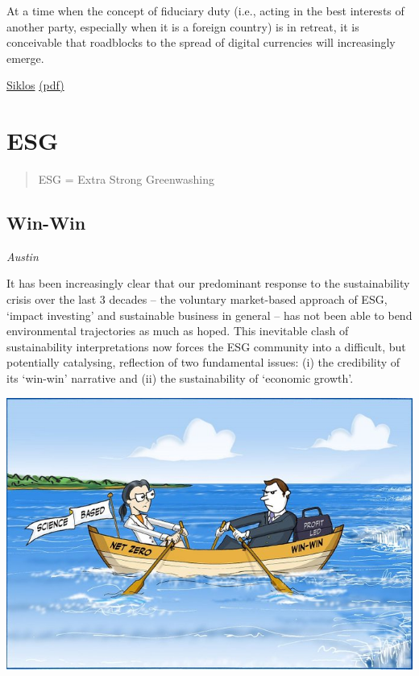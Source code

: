\documentclass[
]{book}
\begin{document}
At a time when
the concept of fiduciary duty (i.e., acting in the best
interests of another party, especially when it is a
foreign country) is in retreat, it is conceivable that
roadblocks to the spread of digital currencies will
increasingly emerge.

\href{https://www.cigionline.org/publications/central-bank-digital-currency-and-governance-fit-purpose}{Siklos}
\href{pdf/Siklos_2021_Central_Bank_Digital_Currency.pdf}{(pdf)}

\hypertarget{esg}{%
\chapter{ESG}\label{esg}}

\begin{quote}
ESG = Extra Strong Greenwashing
\end{quote}

\hypertarget{win-win}{%
\section{Win-Win}\label{win-win}}

\emph{Austin}

It has been increasingly clear that our predominant response to the sustainability crisis over the last 3 decades -- the voluntary market-based approach of ESG, `impact investing' and sustainable business in general -- has not been able to bend environmental trajectories as much as hoped. This inevitable clash of sustainability interpretations now forces the ESG community into a difficult, but potentially catalysing, reflection of two fundamental issues: (i) the credibility of its `win-win' narrative and (ii) the sustainability of `economic growth'.

\includegraphics{fig/win-win_vs_net-zero.jpeg}
\end{document}
